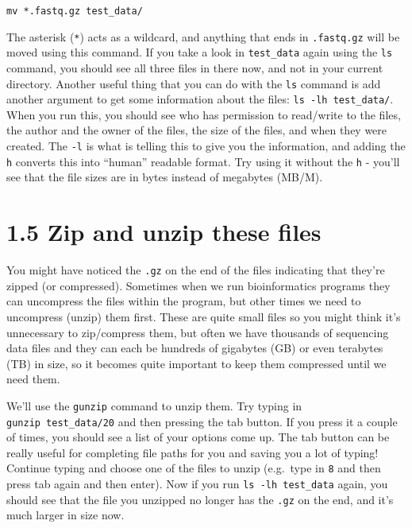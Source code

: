 \documentclass[
]{book}
\begin{document}
\begin{verbatim}
mv *.fastq.gz test_data/
\end{verbatim}

The asterisk (\texttt{*}) acts as a wildcard, and anything that ends in \texttt{.fastq.gz} will be moved using this command. If you take a look in \texttt{test\_data} again using the \texttt{ls} command, you should see all three files in there now, and not in your current directory. Another useful thing that you can do with the \texttt{ls} command is add another argument to get some information about the files: \texttt{ls\ -lh\ test\_data/}. When you run this, you should see who has permission to read/write to the files, the author and the owner of the files, the size of the files, and when they were created. The \texttt{-l} is what is telling this to give you the information, and adding the \texttt{h} converts this into ``human'' readable format. Try using it without the \texttt{h} - you'll see that the file sizes are in bytes instead of megabytes (MB/M).

\section{1.5 Zip and unzip these files}\label{zip-and-unzip-these-files}

You might have noticed the \texttt{.gz} on the end of the files indicating that they're zipped (or compressed). Sometimes when we run bioinformatics programs they can uncompress the files within the program, but other times we need to uncompress (unzip) them first. These are quite small files so you might think it's unnecessary to zip/compress them, but often we have thousands of sequencing data files and they can each be hundreds of gigabytes (GB) or even terabytes (TB) in size, so it becomes quite important to keep them compressed until we need them.

We'll use the \texttt{gunzip} command to unzip them. Try typing in \texttt{gunzip\ test\_data/20} and then pressing the tab button. If you press it a couple of times, you should see a list of your options come up. The tab button can be really useful for completing file paths for you and saving you a lot of typing! Continue typing and choose one of the files to unzip (e.g.~type in \texttt{8} and then press tab again and then enter).
Now if you run \texttt{ls\ -lh\ test\_data} again, you should see that the file you unzipped no longer has the \texttt{.gz} on the end, and it's much larger in size now.
\end{document}
